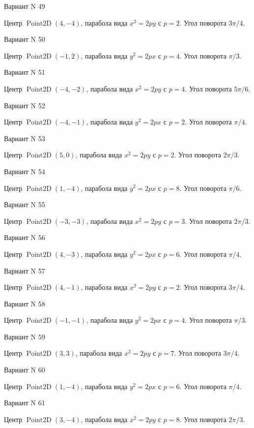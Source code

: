 \documentclass[11pt]{report}
\begin{document}
Вариант N 49

Центр $\operatorname{Point2D}\left(4, -4\right)$, парабола вида $x^{2} = 2py$ с $p = 2$. Угол поворота $3 \pi / 4$.

Вариант N 50

Центр $\operatorname{Point2D}\left(-1, 2\right)$, парабола вида $y^{2} = 2px$ с $p = 4$. Угол поворота $\pi / 3$.

Вариант N 51

Центр $\operatorname{Point2D}\left(-4, -2\right)$, парабола вида $x^{2} = 2py$ с $p = 4$. Угол поворота $5 \pi / 6$.

Вариант N 52

Центр $\operatorname{Point2D}\left(-4, -1\right)$, парабола вида $y^{2} = 2px$ с $p = 2$. Угол поворота $\pi / 4$.

Вариант N 53

Центр $\operatorname{Point2D}\left(5, 0\right)$, парабола вида $x^{2} = 2py$ с $p = 2$. Угол поворота $2 \pi / 3$.

Вариант N 54

Центр $\operatorname{Point2D}\left(1, -4\right)$, парабола вида $y^{2} = 2px$ с $p = 8$. Угол поворота $\pi / 6$.

Вариант N 55

Центр $\operatorname{Point2D}\left(-3, -3\right)$, парабола вида $x^{2} = 2py$ с $p = 3$. Угол поворота $2 \pi / 3$.

Вариант N 56

Центр $\operatorname{Point2D}\left(4, -3\right)$, парабола вида $y^{2} = 2px$ с $p = 6$. Угол поворота $\pi / 4$.

Вариант N 57

Центр $\operatorname{Point2D}\left(4, -1\right)$, парабола вида $x^{2} = 2py$ с $p = 2$. Угол поворота $3 \pi / 4$.

Вариант N 58

Центр $\operatorname{Point2D}\left(-1, -1\right)$, парабола вида $y^{2} = 2px$ с $p = 4$. Угол поворота $\pi / 3$.

Вариант N 59

Центр $\operatorname{Point2D}\left(3, 3\right)$, парабола вида $x^{2} = 2py$ с $p = 7$. Угол поворота $3 \pi / 4$.

Вариант N 60

Центр $\operatorname{Point2D}\left(1, -4\right)$, парабола вида $y^{2} = 2px$ с $p = 6$. Угол поворота $\pi / 4$.

Вариант N 61

Центр $\operatorname{Point2D}\left(3, -4\right)$, парабола вида $x^{2} = 2py$ с $p = 8$. Угол поворота $2 \pi / 3$.
\end{document}
